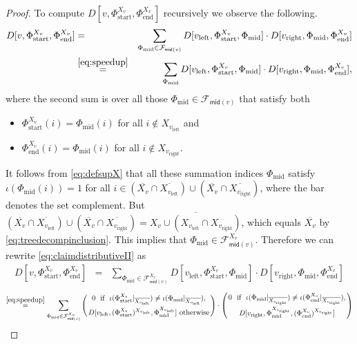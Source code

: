 \documentclass[10pt,a4paper]{article}
\numberwithin{equation}{section}
\theoremstyle{definition}
\newcommand{\CF}{\mathcal{F}}
\begin{document}
\begin{proof}
To compute $D[v, \Phi_\text{start}^{X_v}, \Phi_\text{end}^{X_v}]$ recursively we observe the following.
\begin{eqnarray}\label{eq:claimdistributiveII}
D[v, \Phi_\text{start}^{X_v}, \Phi_\text{end}^{X_v}] &=& 
\sum_{\Phi_\text{mid} \in \CF_{\textsf{mid}(v)}} D[v_\text{left},\Phi_\text{start}^{X_v}, \Phi_\text{mid}] \cdot D[v_\text{right},\Phi_\text{mid}, \Phi_\text{end}^{X_{v}}]\\\nonumber
&\stackrel{\eqref{eq:speedup}}{=}& 
\sum_{\Phi_\text{mid}} D[v_\text{left},\Phi_\text{start}^{X_{v}}, \Phi_\text{mid}] \cdot D[v_\text{right},\Phi_\text{mid}, \Phi_\text{end}^{X_{v}}],
\end{eqnarray}
where the second sum is over all those $\Phi_\text{mid} \in \CF_{\textsf{mid}(v)}$ that satisfy both
\begin{itemize}
\item[$\bullet$] $\Phi_\text{start}^{X_v}(i) = \Phi_\text{mid}(i)$ for all $i \notin X_{v_\text{left}}$ and
\item[$\bullet$] $\Phi_\text{end}^{X_v}(i) = \Phi_\text{mid}(i)$ for all $i \notin X_{v_\text{right}}$.
\end{itemize}
It follows from \eqref{eq:defsupX} that all these summation indices $\Phi_\text{mid}$ satisfy $\iota(\Phi_\text{mid}(i))=1$ for all $i \in (\overline{X_v} \cap \overline{X_{v_\text{left}}})\cup(\overline{X_v} \cap \overline{X_{v_\text{right}}})$, where the bar denotes the set complement.
But $(\overline{X_v} \cap \overline{X_{v_\text{left}}})\cup(\overline{X_v} \cap \overline{X_{v_\text{right}}}) = \overline{X_v \cup (X_{v_\text{left}} \cap X_{v_\text{right}})}$, which equals $\overline{X_v}$ by \eqref{eq:treedecompinclusion}. This implies that $\Phi_\text{mid} \in \CF_{\textsf{mid}(v)}^{X_v}$.
Therefore we can rewrite \eqref{eq:claimdistributiveII} as
\begin{eqnarray*}
D[v, \Phi_\text{start}^{X_v}, \Phi_\text{end}^{X_v}] &=& 
\sum_{\Phi_\text{mid} \in \CF^{X_v}_{\textsf{mid}(v)}} D[v_\text{left},\Phi_\text{start}^{X_v}, \Phi_\text{mid}] \cdot D[v_\text{right},\Phi_\text{mid}, \Phi_\text{end}^{X_{v}}]
\end{eqnarray*}
\begin{eqnarray*}
\stackrel{\eqref{eq:speedup}}{=}\sum_{\Phi_\text{mid} \in \CF^{X_v}_{\textsf{mid}(v)}}
\left(
0 \ \text{ if } \ \iota(\Phi_\text{start}^{X_v}|_{\overline{X_{v_\text{left}}}})\neq\iota(\Phi_\text{mid}|_{\overline{X_{v_\text{left}}}}),
\atop
D[v_\text{left},(\Phi_\text{start}^{X_v})^{X_{v_\text{left}}}, \Phi_\text{mid}^{X_{v_\text{left}}}] \text{ otherwise}
\right)
\cdot
\left(
0 \ \text{ if } \ \iota(\Phi_\text{mid}|_{\overline{X_{v_\text{right}}}})\neq\iota(\Phi_\text{end}^{X_v}|_{\overline{X_{v_\text{right}}}}),
\atop
D[v_\text{right},\Phi_\text{mid}^{X_{v_\text{right}}}, (\Phi_\text{end}^{X_v})^{X_{v_\text{right}}}]
\right)
\end{eqnarray*}


\end{proof}
\end{document}
